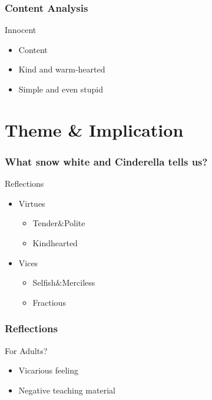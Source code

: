 \documentclass{beamer}
\begin{document}
\begin{frame}
    \frametitle{Content Analysis}
    \begin{block}{Innocent}
        \begin{itemize}
            \item Content
            \item Kind and warm-hearted
            \item Simple and even stupid
        \end{itemize}
    \end{block}
\end{frame}

\section{Theme \& Implication}
\begin{frame}
    \frametitle{What snow white and Cinderella tells us?}
    \begin{block}{Reflections}
        \begin{itemize}
            \item Virtues
                  \begin{itemize}
                      \item Tender$\&$Polite
                      \item Kindhearted
                  \end{itemize}
            \item Vices
                  \begin{itemize}
                      \item Selfish$\&$Merciless
                      \item Fractious
                  \end{itemize}
        \end{itemize}
    \end{block}
\end{frame}

\begin{frame}
    \frametitle{Reflections}
    \begin{block}{For Adults?}
        \begin{itemize}
            \item Vicarious feeling
            \item Negative teaching material
        \end{itemize}
    \end{block}
\end{frame}
\end{document}
